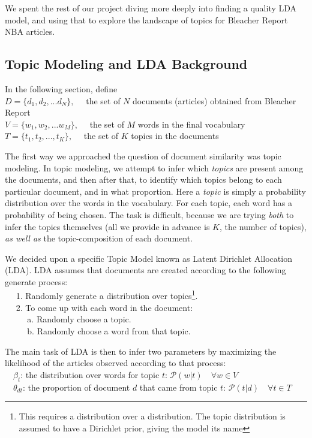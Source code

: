 \documentclass[11pt]{article}
\begin{document}
We spent the rest of our project diving more deeply into finding a quality LDA model, and using that to explore the landscape of topics for Bleacher Report NBA articles. 

\subsection{Topic Modeling and LDA Background}
In the following section, define \\
$D = \{d_1, d_2, ... d_N \}, \quad$ the set of $N$ documents (articles) obtained from Bleacher Report \\
$V = \{w_1, w_2, ... w_M \}, \quad$ the set of $M$ words in the final vocabulary \\
$T = \{t_1, t_2, ..., t_K\}, \quad$ the set of $K$ topics in the documents 

The first way we approached the question of document similarity was topic modeling.  In topic modeling, we attempt to infer which \textit{topics} are present among the documents, and then after that, to identify which topics belong to each particular document, and in what proportion.  Here a \textit{topic} is simply a probability distribution over the words in the vocabulary.  For each topic, each word has a probability of being chosen.  The task is difficult, because we are trying \textit{both} to infer the topics themselves (all we provide in advance is $K$, the number of topics), \textit{as well as} the topic-composition of each document.

We decided upon a specific Topic Model known as Latent Dirichlet Allocation (LDA).  LDA assumes that documents are created according to the following generate process: \\
$\text{} \quad$ 1. Randomly generate a distribution over topics\footnote{This requires a distribution over a distribution. The  topic distribution is assumed to have a Dirichlet prior, giving the model its name}. \\
$\text{} \quad$ 2. To come up with each word in the document: \\
$\text{} \quad$ $\quad$ a. Randomly choose a topic. \\
$\text{} \quad$ $\quad$ b. Randomly choose a word from that topic. 

The main task of LDA is then to infer two parameters by maximizing the likelihood of the articles observed according to that process: \\
$\text{} \quad \beta_t$: the distribution over words for topic $t$: $\mathcal{P}(w | t) \quad \forall w \in V$ \\
$\text{} \quad \theta_{dt}$: the proportion of document $d$ that came from topic $t$: $\mathcal{P}(t | d) \quad \forall t \in T$ 
\end{document}
